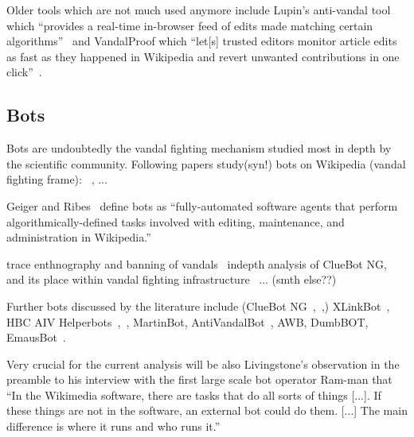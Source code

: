 
Older tools which are not much used anymore include Lupin's anti-vandal tool which
``provides a real-time in-browser feed of edits made matching certain algorithms''~\cite{GeiRib2010}
and VandalProof which
``let[s] trusted editors monitor article edits as fast as they happened in Wikipedia and revert unwanted contributions in one click''~\cite{HalRied2012}.


\subsection{Bots}

Bots are undoubtedly the vandal fighting mechanism studied most in depth by the scientific community.
Following papers study(syn!) bots on Wikipedia (vandal fighting frame):
~\cite{GeiRib2010},
...

Geiger and Ribes~\cite{GeiRib2010} define bots as
``fully-automated software
agents that perform algorithmically-defined tasks involved
with editing, maintenance, and administration in Wikipedia.''

trace enthnography and banning of vandals~\cite{GeiRib2010}
indepth analysis of ClueBot NG, and its place within vandal fighting infrastructure~\cite{GeiHal2013}
... (smth else??)

Further bots discussed by the literature include (ClueBot NG~\cite{GeiHal2013},~\cite{HalRied2012},)
XLinkBot~\cite{HalRied2012},
HBC AIV Helperbots~\cite{HalRied2012},~\cite{GeiRib2010},
MartinBot, AntiVandalBot~\cite{HalRied2012},
AWB, DumbBOT, EmausBot~\cite{GeiHal2013}.

Very crucial for the current analysis will be also Livingstone's observation in the preamble to his interview with the first large scale bot operator Ram-man that
``In the Wikimedia software, there are tasks that do all sorts of things [...].
If these things are not in the software, an external bot could do them. [...]
The main difference is where it runs and who runs it.''~\cite{Livingstone2016}

